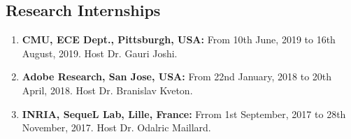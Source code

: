 \documentclass[margin,11pt]{res}
\begin{document}
\begin{resume}

\section{Research Internships}
\begin{enumerate}[leftmargin=*]
\item \textbf{CMU, ECE Dept., Pittsburgh, USA:} From 10th June, 2019 to 16th August, 2019. Host Dr. Gauri Joshi.
\item \textbf{Adobe Research, San Jose, USA:} From 22nd January, 2018 to 20th April, 2018. Host Dr. Branislav Kveton.
\item \textbf{INRIA, SequeL Lab, Lille, France:} Frrom 1st September, 2017 to 28th November, 2017. Host Dr. Odalric Maillard.
\end{enumerate}





\end{resume}
\end{document}
